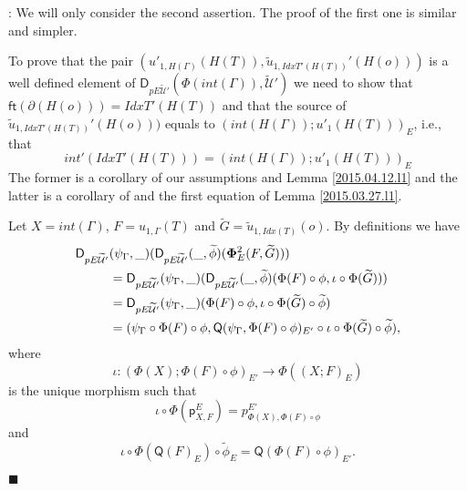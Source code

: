 \documentclass[12pt]{article}
\numberwithin{equation}{section}
\newenvironment{myproof}{{\bf Proof}:}{$\blacksquare$ \vskip 5mm }
\newcommand{\sr}{\rightarrow}
\newcommand{\wt}{\widetilde}
\newcommand{\ft}{\mathsf{ft}}
\newcommand{\p}{\mathsf{p}}
\newcommand{\U}{\mathcal{U}}
\newcommand{\D}{\mathsf{D}}
\newcommand{\Q}{\mathsf{Q}}
\begin{document}
\begin{myproof}
We will only consider the second assertion. The proof of the first one is
similar and simpler.

To prove that the pair $(u'_{1,H(\Gamma)}(H(T)),
\wt{u}_{1,IdxT'(H(T))}'(H(o)))$ is a well defined element of
$\D_{pE\wt{\U}'}(\Phi(int(\Gamma)),\wt{\U}')$ we need to show that
$\ft(\partial(H(o)))=IdxT'(H(T))$ and that the source of
$\wt{u}_{1,IdxT'(H(T))}'(H(o)))$ equals to $(int(H(\Gamma)); u'_1(H(T)))_{E}$,
i.e., that
%
$$int'(IdxT'(H(T)))=(int(H(\Gamma)); u'_1(H(T)))_{E}$$
%
The former is a corollary of our assumptions and Lemma \ref{2015.04.12.l1} and
the latter is a corollary of \cite[Problem 3.3(1)]{fromunivwithPi} and the
first equation of Lemma \ref{2015.03.27.l1}.

Let $X=int(\Gamma)$, $F=u_{1,\Gamma}(T)$ and $\wt{G}=\wt{u}_{1,Idx(T)}(o)$. By
definitions we have
%
\begin{align*}
  \D_{pE\wt{\U}'}&(\psi_{\Gamma},\_)(\D_{pE\wt{\U}'}(\_,\wt{\phi})({\bf\Phi}_{E}^2(F,\wt{G}))) \\
    & = \D_{pE\wt{\U}'}(\psi_{\Gamma},\_)(\D_{pE\wt{\U}'}(\_,\wt{\phi})(\Phi(F)\circ \phi, \iota\circ \Phi(\wt{G}))) \\
    & = \D_{pE\wt{\U}'}(\psi_{\Gamma},\_)(\Phi(F)\circ \phi, \iota\circ \Phi(\wt{G})\circ\wt{\phi}) \\
    & = (\psi_{\Gamma}\circ\Phi(F)\circ \phi, \Q(\psi_{\Gamma},\Phi(F)\circ\phi)_{E'}\circ\iota\circ \Phi(\wt{G})\circ\wt{\phi}),
\end{align*}
%
where
%
$$\iota:(\Phi(X);\Phi(F)\circ \phi)_{E'}\sr \Phi((X;F)_{E})$$
%
is the unique morphism such that
%
$$\iota\circ \Phi(\p^E_{X,F})=p^{E'}_{\Phi(X),\Phi(F)\circ\phi}$$
and
$$\iota\circ \Phi(\Q(F)_E)\circ \wt{\phi}_E=\Q(\Phi(F)\circ\phi)_{E'}.$$


\end{myproof}
\end{document}
